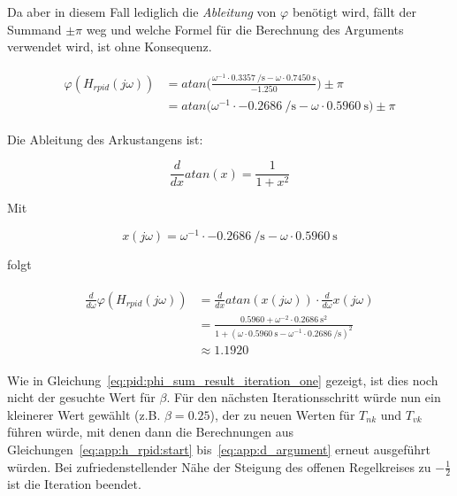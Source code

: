 Da aber in diesem Fall lediglich die \emph{Ableitung} von $\varphi$ ben\"otigt
wird, f\"allt der Summand $\pm\pi$ weg  und welche Formel f\"ur die Berechnung
des  Arguments   verwendet  wird,  ist  ohne   Konsequenz.

\begin{gather} \label{eq:app:argument_numerical}
    \begin{split}
        \varphi(H_{rpid}(j\omega)) & = atan \biggl( \frac{ \omega^{-1} \cdot \SI{0.3357}{\per\second} - \omega \cdot \SI{0.7450}{\second} }{ -1.250 } \biggr) \pm \pi \\
                                   & = atan \biggl( \omega^{-1} \cdot \SI{-0.2686}{\per\second}       - \omega \cdot \SI{0.5960}{\second}             \biggr) \pm \pi
    \end{split}
\end{gather}

Die Ableitung des Arkustangens ist:

\begin{equation} \label{eq:app:d_atan}
    \frac{d}{dx} atan(x) = \frac{1}{1+x^2}
\end{equation}

Mit

\begin{equation} \label{eq:app:x_of_omega}
    x(j\omega) = \omega^{-1} \cdot \SI{-0.2686}{\per\second} - \omega \cdot \SI{0.5960}{\second}
\end{equation}

folgt

\begin{gather} \label{eq:app:d_argument}
    \begin{split}
        \frac{d}{d\omega} \varphi(H_{rpid}(j\omega)) & = \frac{d}{dx} atan(x(j\omega)) \cdot \frac{d}{d\omega} x(j\omega) \\
                                                     & = \frac{0.5960 + \omega^{-2} \cdot \SI{0.2686}{\square\second}}{1+(\omega \cdot \SI{0.5960}{\second} - \omega^{-1} \cdot \SI{0.2686}{\per\second})^2} \\
                                                     & \approx 1.1920
    \end{split}
\end{gather}


Wie    in  Gleichung~\ref{eq:pid:phi_sum_result_iteration_one}  gezeigt,   ist
dies  noch  nicht  der  gesuchte  Wert  f\"ur  $\beta$. F\"ur  den  n\"achsten
Iterationsschritt    w\"urde     nun    ein    kleinerer     Wert    gew\"ahlt
(z.B.   $\beta=0.25$),    der   zu    neuen   Werten   f\"ur    $T_{nk}$   und
$T_{vk}$   f\"uhren   w\"urde,   mit   denen   dann   die   Berechnungen   aus
Gleichungen~\ref{eq:app:h_rpid:start}    bis~\ref{eq:app:d_argument}    erneut
ausgef\"uhrt w\"urden. Bei zufriedenstellender N\"ahe der Steigung des offenen
Regelkreises zu $-\frac{1}{2}$ ist die Iteration beendet.
